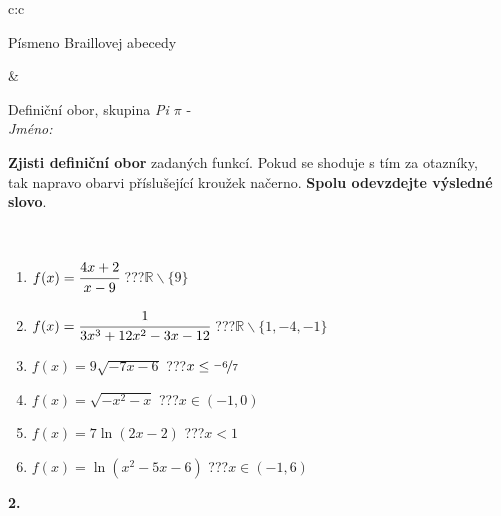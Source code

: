 \documentclass[10pt]{report}
\begin{document}
\begin{tabular}{c:c}
\begin{minipage}[c][104.5mm][t]{0.5\linewidth}
\begin{center}
\begin{minipage}{0.20\linewidth}
\begin{center}
{\small Písmeno Braillovej abecedy}
\end{center}
\end{minipage}
\end{center}
\end{minipage}
&
\begin{minipage}[c][104.5mm][t]{0.5\linewidth}
\begin{center}
\vspace{7mm}
{\huge Definiční obor, skupina \textit{Pi $\pi$} -}\\[5mm]
\textit{Jméno:}\phantom{xxxxxxxxxxxxxxxxxxxxxxxxxxxxxxxxxxxxxxxxxxxxxxxxxxxxxxxxxxxxxxxxx}\\[5mm]
\begin{minipage}{0.95\linewidth}
\begin{center}
\textbf{Zjisti definiční obor} zadaných funkcí. Pokud se shoduje s tím za otazníky,\\tak napravo obarvi příslušející kroužek načerno. \textbf{Spolu odevzdejte výsledné slovo}.
\end{center}
\end{minipage}
\\[1mm]
\begin{minipage}{0.79\linewidth}
\begin{center}
\begin{varwidth}{\linewidth}
\begin{enumerate}
\normalsizerrr
\item $f(x)=\cfrac{4x+2}{x-9}$\quad \dotfill\; ???\;\dotfill \quad $\mathbb{R}\smallsetminus\{9\}$
\item $f(x)=\cfrac{1}{3x^3+12x^2-3x-12}$\quad \dotfill\; ???\;\dotfill \quad $\mathbb{R}\smallsetminus\{1,-4,-1\}$
\item $f(x)=9\sqrt{-7x-6}$\quad \dotfill\; ???\;\dotfill \quad $x\leq\nicefrac{-6}{7}$
\item $f(x)=\sqrt{-x^2-x}$\quad \dotfill\; ???\;\dotfill \quad $x\in(-1 , 0)$
\item $f(x)=7\ln{(2x-2)}$\quad \dotfill\; ???\;\dotfill \quad $x<1$
\item $f(x)=\ln{(x^2-5x-6)}$\quad \dotfill\; ???\;\dotfill \quad $x\in(-1 , 6)$
\end{enumerate}
\end{varwidth}
\end{center}
\end{minipage}
\begin{minipage}{0.20\linewidth}
\begin{center}
{\Huge\bfseries 2.} \\[2mm]

\end{center}
\end{minipage}
\end{center}
\end{minipage}
\end{tabular}
\end{document}
